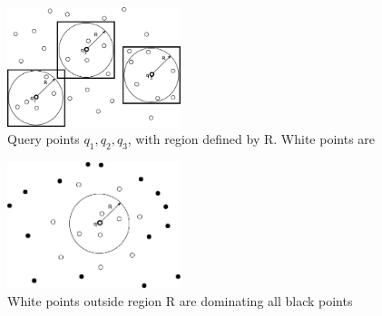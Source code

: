 \begin{figure}[hbt]
  \center
        \includegraphics[width=0.45\textwidth]{figures/queryregions}
        \caption{Query points $q_1,q_2,q_3$, with region defined by R. White points are \poins}
  \label{fig:queryreg}
\end{figure}

\begin{figure}[hbt]
  \center
        \includegraphics[width=0.45\textwidth]{figures/dominating}
        \caption{White points outside region R are dominating all black points}
  \label{fig:dominating}
\end{figure}